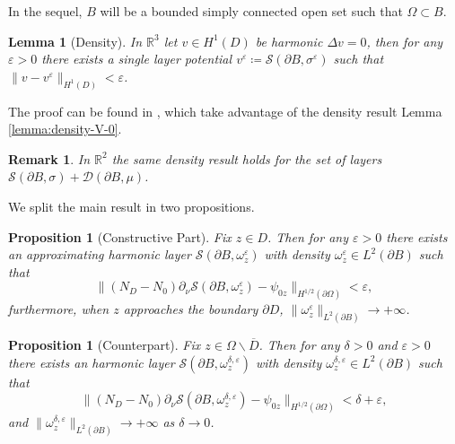\documentclass[10pt, a4paper, twoside, openright]{book}
\theoremstyle{definition}
\theoremstyle{plain}
\theoremstyle{plain}
\theoremstyle{plain}
\newtheorem{proposition}[subsection]{Proposition}
\theoremstyle{plain}
\newtheorem{remark}[subsection]{Remark}
\theoremstyle{plain}
\newtheorem{lemma}[subsection]{Lemma}
\theoremstyle{plain}
\theoremstyle{plain}
\theoremstyle{plain}
\let\epsilon\varepsilon
\begin{document}
 \par
 In the sequel, $B$ will be a bounded simply connected open set such that $\Omega\subset B$.
\begin{lemma}[Density]
 \label{lemma:lsm-density}
 In $\mathbb{R}^3$ let $v\in H^1(D)$ be harmonic $\Delta v=0$, then for any $\epsilon>0$ there exists 
 a single layer potential $v^\epsilon\coloneqq\mathcal{S}(\partial B, \sigma^\epsilon)$ such that $\|v-v^\epsilon\|_{H^1(D)}<\epsilon$.
\end{lemma}
The proof can be found in \cite{somersalo:preprint}, which take advantage of the density result Lemma \ref{lemma:density-V-0}.
\begin{remark}
 In $\mathbb{R}^2$ the same density result holds for the set of layers $\mathcal{S}(\partial B, \sigma)+ \mathcal{D}(\partial B,\mu)$.
\end{remark}
We split the main result in two propositions.
\begin{proposition}[Constructive Part]
\label{prop:lsm-constructive}
Fix $z \in D$. Then for any $\epsilon > 0$ there exists an approximating harmonic layer $\mathcal{S}(\partial B, \omega^\epsilon_z)$ with density $\omega^\epsilon_z\in L^2(\partial B)$  such that
\begin{equation}
 \|({N_D} - {N_0})\partial_\nu\mathcal{S}(\partial B, \omega^\epsilon_z) - \psi_{0z}\|_{H^{1/2}(\partial\Omega)} < \epsilon,
\end{equation}
furthermore, when $z$ approaches the boundary $\partial D$, $\|\omega^\epsilon_z\|_{L^2(\partial B)}\to + \infty$.
\end{proposition}
\begin{proposition}[Counterpart]
\label{prop:lsm-counterpart}
Fix $z \in \Omega\backslash\overline{D}$. Then for any $\delta>0$ and $\epsilon > 0$ there exists an harmonic layer $\mathcal{S}(\partial B, \omega^{\delta, \epsilon}_z)$ with density $\omega^{\delta, \epsilon}_z\in L^2(\partial B)$ such that
\begin{equation}
 \|({N_D} - {N_0})\partial_\nu\mathcal{S}(\partial B, \omega^{\delta,\epsilon}_z) - \psi_{0z}\|_{H^{1/2}(\partial\Omega)} < \delta + \epsilon,
\end{equation}
and $\|\omega^{\delta, \epsilon}_z\|_{L^2(\partial B)}\to + \infty$ as $\delta\to 0$.
\end{proposition}
\end{document}

